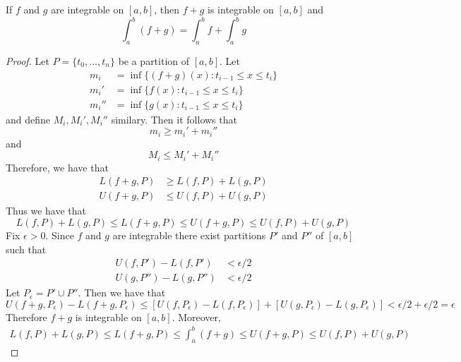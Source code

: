 \documentclass[12pt, a4paper, oneside, openright, titlepage]{book}
\begin{document}
\begin{thm}
    If $f$ and $g$ are integrable on $[a,b]$, then $f+g$ is integrable on $[a,b]$ and \begin{equation}
        \int_a^b(f+g) = \int_a^bf+\int_a^bg
    \end{equation}
\end{thm}
\begin{proof}
    Let $P = \{t_0,...,t_n\}$ be a partition of $[a,b]$. Let \begin{align*}
        m_i &= \inf\{(f+g)(x):t_{i-1} \leq x \leq t_i\} \\
        m_i'&= \inf\{f(x):t_{i-1} \leq x \leq t_i\} \\
        m_i''&= \inf\{g(x):t_{i-1} \leq x \leq t_i\} 
    \end{align*}
    and define $M_i,M_i',M_i''$ similary. Then it follows that \begin{equation*}
        m_i \geq m_i' + m_i''
    \end{equation*}
    and \begin{equation*}
        M_i \leq M_i' + M_i''
    \end{equation*}
    Therefore, we have that \begin{align*}
        L(f+g,P) &\geq L(f,P) + L(g,P) \\
        U(f+g,P) &\leq U(f,P) + U(g,P)
    \end{align*}
    Thus we have that \begin{equation*}
        L(f,P) + L(g,P) \leq L(f+g,P) \leq U(f+g,P) \leq U(f,P) + U(g,P)
    \end{equation*}
    Fix $\epsilon > 0$. Since $f$ and $g$ are integrable there exist partitions $P'$ and $P''$ of $[a,b]$ such that \begin{align*}
        U(f,P') - L(f,P') &< \epsilon/2 \\
        U(g,P'') - L(g,P'') &< \epsilon/2
    \end{align*}
    Let $P_{\epsilon} = P' \cup P''$. Then we have that \begin{equation*}
        U(f+g,P_{\epsilon}) - L(f+g,P_{\epsilon}) \leq [U(f,P_{\epsilon}) - L(f,P_{\epsilon})] + [U(g,P_{\epsilon}) - L(g,P_{\epsilon})] < \epsilon/2 + \epsilon/2 = \epsilon
    \end{equation*}
    Therefore $f+g$ is integrable on $[a,b]$. Moreover, \begin{align*}
        L(f,P) + L(g,P) \leq L(f+g,P) \leq \int_a^b(f+g) \leq U(f+g,P) \leq U(f,P) + U(g,P)
    \end{align*}

\end{proof}
\end{document}
